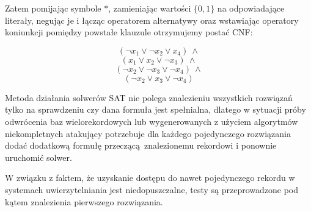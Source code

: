 Zatem pomijając symbole $*$, zamieniając wartości $\{0,1\}$ na odpowiadające literały, negując je i łącząc operatorem alternatywy
oraz wstawiając operatory koniunkcji pomiędzy powstałe klauzule otrzymujemy postać CNF:

\[ (\neg x_1 \lor \neg x_2 \lor x_4)~\land \]\[  (x_1 \lor x_2 \lor \neg x_3)~\land \]\[ (\neg x_2 \lor \neg x_3 \lor \neg x_4)~\land \]\[(\neg x_2 \lor x_3 \lor \neg x_4) \]


Metoda działania solwerów SAT nie polega znalezieniu wszystkich rozwiązań tylko na sprawdzeniu czy dana formuła jest spełnialna, 
dlatego w sytuacji próby odwrócenia baz wielorekordowych lub wygenerowanych z użyciem algorytmów niekompletnych atakujący potrzebuje dla każdego pojedynczego rozwiązania dodać dodatkową formułę przeczącą znalezionemu rekordowi i ponownie uruchomić solwer.   

W związku z faktem, że uzyskanie dostępu do nawet pojedynczego rekordu w systemach uwierzytelniania jest niedopuszczalne, testy są przeprowadzone pod kątem znalezienia pierwszego rozwiązania. 